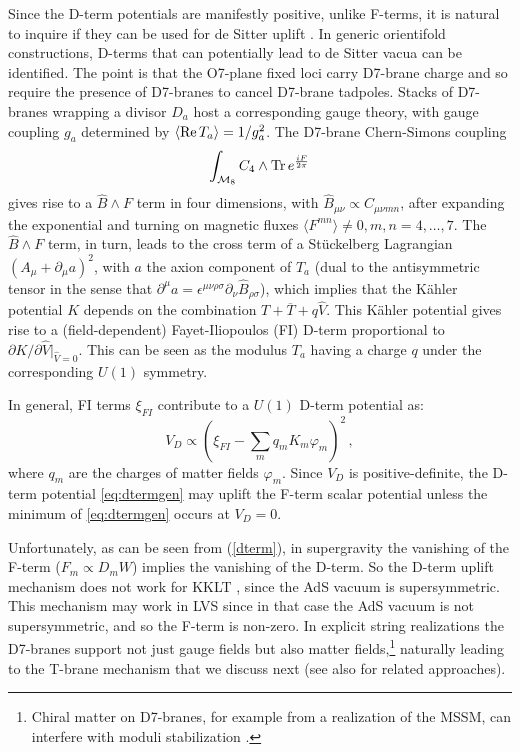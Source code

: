 \documentclass[12pt,a4wide]{article}
\def\be{\begin{equation}}
\def\ee{\end{equation}}
\begin{document}
\begin{itemize}
Since the  D-term potentials  are manifestly positive, unlike F-terms, it is natural to inquire if they can be used for de Sitter uplift \cite{Burgess:2005jx}.  In generic orientifold constructions, D-terms that can potentially lead to de Sitter vacua can be identified. The point  is that the O7-plane fixed loci carry D7-brane charge and so require the presence of D7-branes to cancel D7-brane tadpoles. Stacks of  D7-branes wrapping a divisor $D_a$ host a corresponding gauge theory, with gauge coupling $g_a$ determined by $\langle \hbox{Re}\,T_a\rangle =1/g_a^2$. 
The D7-brane Chern-Simons coupling
\be
\int_{\mathcal{M}_8}C_4\wedge\hbox{Tr}\, e^{\frac{i F}{2\pi}}
\ee
gives rise to a $\hat B\wedge F$ term in four dimensions, with $\hat B_{\mu\nu}\propto C_{\mu\nu mn}$, after expanding the exponential and turning on magnetic fluxes $\langle F^{mn}\rangle \neq 0, m,n=4,\ldots, 7$. The $\hat B\wedge F$ term, in turn,  
leads to the cross term of a St\"uckelberg Lagrangian  $\left(A_\mu +\partial_\mu a\right)^2$, with $a$ the axion component of $T_a$ (dual to the antisymmetric tensor  in the sense that  $\partial^\mu a=\epsilon^{\mu\nu\rho\sigma}\partial_\nu \hat B_{\rho\sigma}$),  
which implies that the K\"ahler potential $K$ depends on the combination $T+\overline T+q\hat V$. This K\"ahler potential gives rise to a (field-dependent) Fayet-Iliopoulos (FI)
D-term  proportional to $\partial K/\partial \hat V\big |_{\hat V=0}$. This can be seen as the modulus $T_a$ having a charge $q$ under the corresponding $U(1)$ symmetry.

In general, FI terms $\xi_{FI}$ contribute to a $U(1)$ D-term potential as:
\be\label{eq:dtermgen}
V_D\propto \left(\xi_{FI}-\sum_mq_mK_m \varphi_m\right)^2\,,
\ee
where $q_m$ are the charges of matter fields $\varphi_m$. Since $V_D$ is 
positive-definite, the D-term potential \eqref{eq:dtermgen} may uplift the F-term scalar potential unless the minimum of \eqref{eq:dtermgen} occurs at $V_D=0$.

Unfortunately, as can be seen from (\ref{dterm}), in supergravity the vanishing of the F-term ($F_m\propto D_m W$) implies the vanishing of the D-term. So the D-term uplift mechanism does not work for KKLT \cite{Choi:2005ge, Villadoro:2005yq}, since the AdS vacuum is supersymmetric.   This mechanism may work in LVS since in that case the AdS vacuum is not supersymmetric, and so the F-term is non-zero.
In explicit string realizations the D7-branes support not just gauge fields but also matter fields,\footnote{Chiral matter on D7-branes, for example from a realization of the MSSM, can interfere with moduli stabilization \cite{Blumenhagen:2007sm}.} naturally  leading to the T-brane mechanism that we discuss next (see also \cite{Parameswaran:2007kf,Braun:2015pza} for related approaches).


\end{itemize}
\end{document}
